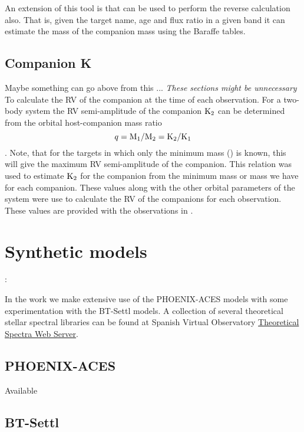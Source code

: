 An extension of this tool is that can be used to perform the reverse calculation also. That is, given the target name, age and flux ratio in a given band it can estimate the mass of the companion mass using the Baraffe tables.




\subsection{Companion K}  Maybe something can go above from this ...
\label{sec:companion_RV}
\emph{These sections might be unnecessary}\\

To calculate the {RV} of the companion at the time of each observation. For a two-body system the {RV} semi-amplitude of the companion \(\textrm{K}_{2}\) can be determined from the orbital host-companion mass ratio \[q = \textrm{M}_{1}/\textrm{M}_{2} = \textrm{K}_{2}/\textrm{K}_{1}\label{eqn:q_ratio_K2}\].
Note, that for the targets in which only the minimum mass (\mtwosini) is known, this will give the maximum {RV} semi-amplitude of the companion.
This relation was used to estimate \(\textrm{K}_{2}\) for the companion from the minimum mass or mass we have for each companion. These values along with the other orbital parameters of the system were use to calculate the {RV} of the companions for each observation. These values are provided with the observations in .


\section{Synthetic models}:

In the work we make extensive use of the {PHOENIX-ACES} models with some experimentation with the {BT-Settl} models.
A collection of several theoretical stellar spectral libraries can be found at Spanish Virtual Observatory \href{http://svo2.cab.inta-csic.es/theory/newov/index.php}{Theoretical Spectra Web Server}.

\subsection{PHOENIX-ACES}

Available 


\subsection{BT-Settl}

